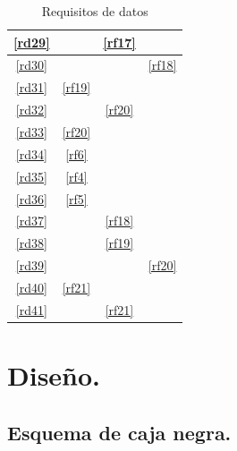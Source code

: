 \documentclass[12pt,a4paper]{article}
\begin{document}
\begin{table}[H]
\begin{center}
\begin{tabular}{|c|c|c|c|}
\hline
	\ref{rd29} &  & \ref{rf17} & \\
\hline
	\ref{rd30} &  &  & \ref{rf18} \\
\hline
	\ref{rd31} & \ref{rf19} &  & \\
\hline
	\ref{rd32} &  & \ref{rf20} & \\
\hline
	\ref{rd33} & \ref{rf20} &  & \\
\hline
	\ref{rd34} & \ref{rf6} &  & \\
\hline
	\ref{rd35} & \ref{rf4} &  & \\
\hline
	\ref{rd36} & \ref{rf5} &  & \\
\hline
	\ref{rd37} &  & \ref{rf18} & \\
\hline
	\ref{rd38} &  & \ref{rf19} & \\
\hline
	\ref{rd39} &  & & \ref{rf20} \\
\hline
	\ref{rd40} & \ref{rf21} & &  \\
\hline
	\ref{rd41} &  & \ref{rf21} &  \\
\hline
\end{tabular}
\end{center}
\caption{Requisitos de datos}
\end{table}

\section{Diseño.}
\subsection{Esquema de caja negra.}
  \begin{center}
  \end{center}
\end{document}

